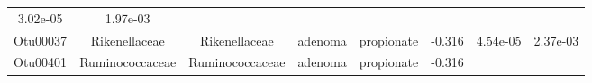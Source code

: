 \documentclass[11pt,]{article}
\begin{document}
\begin{longtable}[]{@{}cccccccc@{}}
\begin{minipage}[t]{0.08\columnwidth}
3.02e-05\strut
\end{minipage} & \begin{minipage}[t]{0.08\columnwidth}\centering\strut
1.97e-03\strut
\end{minipage}\tabularnewline
\begin{minipage}[t]{0.08\columnwidth}\centering\strut
Otu00037\strut
\end{minipage} & \begin{minipage}[t]{0.15\columnwidth}\centering\strut
Rikenellaceae\strut
\end{minipage} & \begin{minipage}[t]{0.15\columnwidth}\centering\strut
Rikenellaceae\strut
\end{minipage} & \begin{minipage}[t]{0.08\columnwidth}\centering\strut
adenoma\strut
\end{minipage} & \begin{minipage}[t]{0.09\columnwidth}\centering\strut
propionate\strut
\end{minipage} & \begin{minipage}[t]{0.07\columnwidth}\centering\strut
-0.316\strut
\end{minipage} & \begin{minipage}[t]{0.08\columnwidth}\centering\strut
4.54e-05\strut
\end{minipage} & \begin{minipage}[t]{0.08\columnwidth}\centering\strut
2.37e-03\strut
\end{minipage}\tabularnewline
\begin{minipage}[t]{0.08\columnwidth}\centering\strut
Otu00401\strut
\end{minipage} & \begin{minipage}[t]{0.15\columnwidth}\centering\strut
Ruminococcaceae\strut
\end{minipage} & \begin{minipage}[t]{0.15\columnwidth}\centering\strut
Ruminococcaceae\strut
\end{minipage} & \begin{minipage}[t]{0.08\columnwidth}\centering\strut
adenoma\strut
\end{minipage} & \begin{minipage}[t]{0.09\columnwidth}\centering\strut
propionate\strut
\end{minipage} & \begin{minipage}[t]{0.07\columnwidth}\centering\strut
-0.316\strut
\end{minipage} & \begin{minipage}[t]{0.08\columnwidth}\centering\strut

\end{minipage}
\end{longtable}
\end{document}
